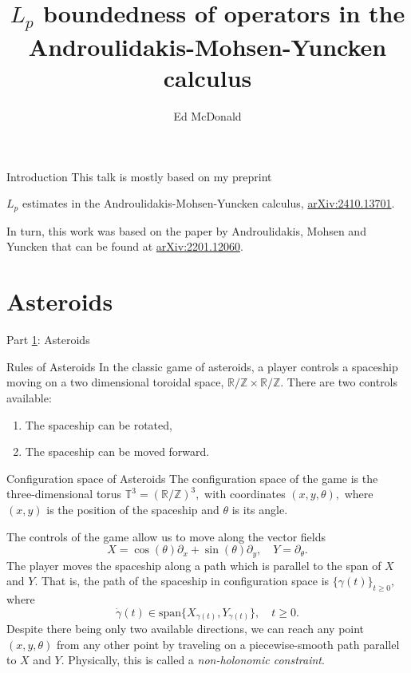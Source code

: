 \documentclass{beamer}
\newcommand\makebeamertitle{\frame{\maketitle}}%
\numberwithin{equation}{section}
\theoremstyle{plain}
\theoremstyle{plain}
\theoremstyle{definition}
\theoremstyle{plain}
\theoremstyle{plain}
\theoremstyle{definition}
\newcommand{\Rl}{\mathbb{R}}
\newcommand{\Itgr}{\mathbb{Z}}
\newcommand{\Circ}{\mathbb{T}}
\begin{document}
\title[$L_p$ estimates in the AMY calculus]{$L_p$ boundedness of operators in the Androulidakis-Mohsen-Yuncken calculus}


\author[E. McDonald]{Ed McDonald}



\makebeamertitle

\begin{frame}{Introduction}
  This talk is mostly based on my preprint
  \begin{center}
    $L_p$ estimates in the Androulidakis-Mohsen-Yuncken calculus, \href{https://arxiv.org/abs/2410.13701}{arXiv:2410.13701}.
  \end{center}
  In turn, this work was based on the paper by Androulidakis, Mohsen and Yuncken that can be found at \href{https://arxiv.org/abs/2201.12060v2}{arXiv:2201.12060}.
\end{frame}



\section{Asteroids}\label{asteroids_section}

\begin{frame}
  \Huge{Part \ref{asteroids_section}: Asteroids}
\end{frame}

\begin{frame}{Rules of Asteroids}
  In the classic game of asteroids, a player controls a spaceship moving on a two dimensional toroidal space, $\Rl/\Itgr\times \Rl/\Itgr.$ There are two controls available:
  \begin{enumerate}[{\rm (i)}]
    \item{} The spaceship can be rotated,
    \item{} The spaceship can be moved forward.
  \end{enumerate}
\end{frame}

\begin{frame}{Configuration space of Asteroids}
  The configuration space of the game is the three-dimensional torus $\Circ^3 = (\Rl/\Itgr)^3,$ with coordinates $(x,y,\theta),$ where $(x,y)$ is the position of the spaceship and $\theta$ is its angle.

  The controls of the game allow us to move along the vector fields
  \[
    X = \cos(\theta)\partial_x+\sin(\theta)\partial_y,\quad Y = \partial_\theta.
  \]
  \pause
  The player moves the spaceship along a path which is parallel to the span of $X$ and $Y.$ That is, the path of the spaceship in configuration space is $\{\gamma(t)\}_{t\geq 0},$ where
  \[
    \dot{\gamma}(t) \in \mathrm{span}\{X_{\gamma(t)},Y_{\gamma(t)}\},\quad t\geq 0.
  \]
  \pause
  Despite there being only two available directions, we can reach any point $(x,y,\theta)$ from any other point by traveling on a piecewise-smooth path parallel to $X$ and $Y.$
  \pause
  Physically, this is called a \emph{non-holonomic constraint}.
\end{frame}
\end{document}
